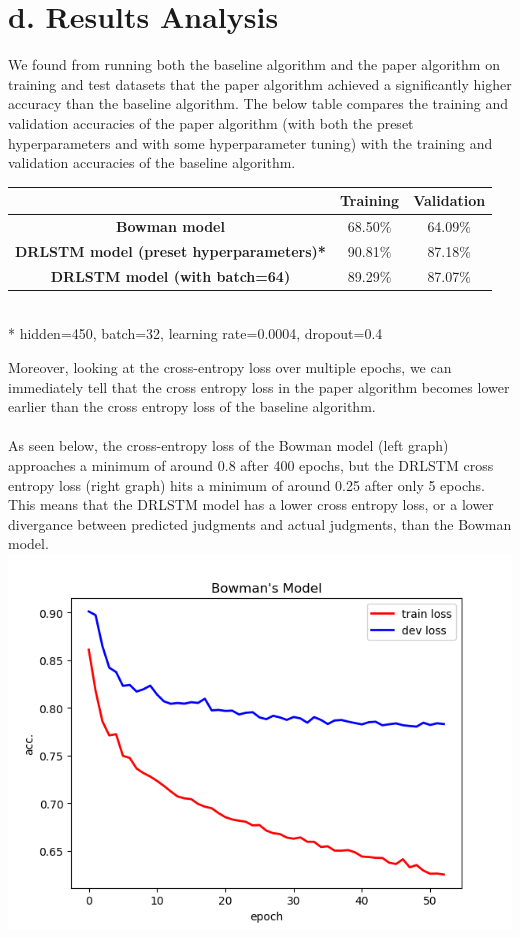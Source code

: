 \documentclass[12pt,letterpaper]{article}
\begin{document}
\section*{d. Results Analysis}
We found from running both the baseline algorithm and the paper algorithm on training and test datasets that the paper algorithm achieved a significantly higher accuracy than the baseline algorithm. The below table compares the training and validation accuracies of the paper algorithm (with both the preset hyperparameters and with some hyperparameter tuning) with the training and validation accuracies of the baseline algorithm. \\
\begin{center}
    \begin{tabular}{| c | c | c |}
        \hline
         & \textbf{Training} & \textbf{Validation}\\ \hline
        \textbf{Bowman model} & 68.50$\%$ & 64.09$\%$
        \\ \hline
        \textbf{DRLSTM model (preset hyperparameters)*} & 90.81$\%$ & 87.18$\%$\\ \hline
        \textbf{DRLSTM model (with batch=64)} & 89.29$\%$ & 87.07$\%$\\ \hline
    \end{tabular} \\
    * hidden=450, batch=32, learning rate=0.0004, dropout=0.4 \\
\end{center}
Moreover, looking at the cross-entropy loss over multiple epochs, we can immediately tell that the cross entropy loss in the paper algorithm becomes lower earlier than the cross entropy loss of the baseline algorithm. \\
\\
As seen below, the cross-entropy loss of the Bowman model (left graph) approaches a minimum of around 0.8 after 400 epochs, but the DRLSTM cross entropy loss (right graph) hits a minimum of around 0.25 after only 5 epochs. This means that the DRLSTM model has a lower cross entropy loss, or a lower divergance between predicted judgments and actual judgments, than the Bowman model.\\
\includegraphics[scale=0.53]{Bowmanxent.PNG}
\end{document}
